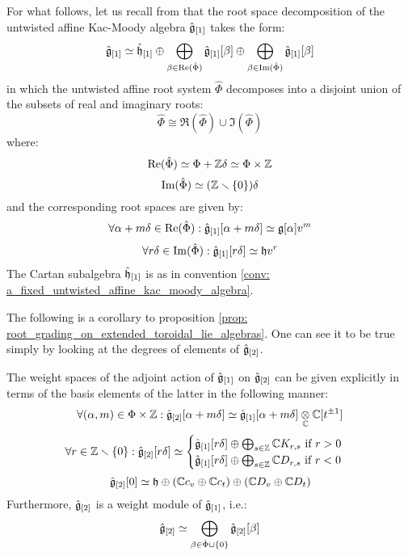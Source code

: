         \begin{remark}
            For what follows, let us recall from \cite[Chapter 7]{kac_infinite_dimensional_lie_algebras} that the root space decomposition of the untwisted affine Kac-Moody algebra $\hat{\mathfrak{g}}_{[1]}$ takes the form:
                $$\hat{\mathfrak{g}}_{[1]} \simeq \hat{\mathfrak{h}}_{[1]} \oplus \bigoplus_{\beta \in \operatorname{Re}(\hat{\Phi})} \hat{\mathfrak{g}}_{[1]}[\beta] \oplus \bigoplus_{\beta \in \operatorname{Im}(\hat{\Phi})} \hat{\mathfrak{g}}_{[1]}[\beta]$$
            in which the untwisted affine root system $\hat{\Phi}$ decomposes into a disjoint union of the subsets of real and imaginary roots:
                $$\hat{\Phi} \cong \Re(\hat{\Phi}) \cup \Im(\hat{\Phi})$$
            where:
                $$\Re(\hat{\Phi}) \cong \Phi + \Z\delta \cong \Phi \x \Z$$
                $$\operatorname{Im}(\hat{\Phi}) \simeq (\mathbb{Z} \smallsetminus \{0\})\delta$$
            and the corresponding root spaces are given by:
                $$\forall \alpha + m\delta \in \operatorname{Re}(\hat{\Phi}): \hat{\mathfrak{g}}_{[1]}[\alpha + m\delta] \simeq \mathfrak{g}[\alpha] v^m$$
                $$\forall r\delta \in \operatorname{Im}(\hat{\Phi}): \hat{\mathfrak{g}}_{[1]}[r\delta] \simeq \mathfrak{h} v^r$$
            The Cartan subalgebra $\hat{\mathfrak{h}}_{[1]}$ is as in convention \ref{conv: a_fixed_untwisted_affine_kac_moody_algebra}.
        \end{remark}    
        The following is a corollary to proposition \ref{prop: root_grading_on_extended_toroidal_lie_algebras}. One can see it to be true simply by looking at the degrees of elements of $\hat{\mathfrak{g}}_{[2]}$. 
        \begin{theorem} \label{theorem: root_space_decomposition_for_extended_toroidal_lie_algebras}
            The weight spaces of the adjoint action of $\hat{\mathfrak{g}}_{[1]}$ on $\hat{\mathfrak{g}}_{[2]}$ can be given explicitly in terms of the basis elements of the latter in the following manner:
                $$\forall (\alpha, m) \in \Phi \x \Z: \hat{\g}_{[2]}[\alpha + m\delta] \cong \hat{\g}_{[1]}[\alpha + m\delta] \tensor_{\bbC} \bbC[t^{\pm 1}]$$
                $$
                    \forall r \in \mathbb{Z} \smallsetminus \{0\}: \hat{\mathfrak{g}}_{[2]}[r \delta] \simeq
                    \begin{cases}
                        \text{$\hat{\mathfrak{g}}_{[1]}[r \delta] \oplus \bigoplus_{s \in \mathbb{Z}} \mathbb{C} K_{r, s}$ if $r > 0$}
                        \\
                        \text{$\hat{\mathfrak{g}}_{[1]}[r \delta] \oplus \bigoplus_{s \in \mathbb{Z}} \mathbb{C} D_{r, s}$ if $r < 0$}
                    \end{cases}
                $$
                $$\hat{\mathfrak{g}}_{[2]}[0] \simeq \mathfrak{h} \oplus (\mathbb{C} c_v \oplus \mathbb{C} c_t) \oplus (\mathbb{C} D_v \oplus \mathbb{C} D_t)$$
            Furthermore, $\hat{\mathfrak{g}}_{[2]}$ is a weight module of $\hat{\mathfrak{g}}_{[1]}$, i.e.:
                $$\hat{\mathfrak{g}}_{[2]} \simeq \bigoplus_{\beta \in \hat{\Phi} \cup \{0\}} \hat{\mathfrak{g}}_{[2]}[\beta]$$
        \end{theorem}
